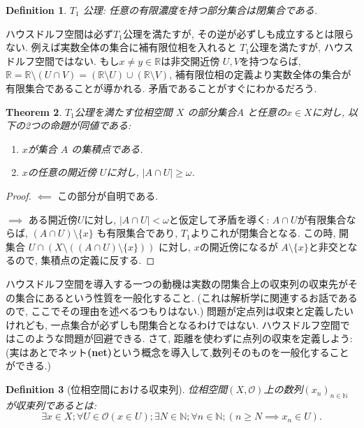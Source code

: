 \documentclass[lualatex]{ltjsbook}
\newtheorem{theorem}{Theorem}[section]
\newtheorem{definition}[theorem]{Definition}
\theoremstyle{remark}
\theoremstyle{plain}
\begin{document}
\begin{definition}
	$T_1$ 公理: 任意の有限濃度を持つ部分集合は閉集合である.
\end{definition}

ハウスドルフ空間は必ず$T_1$公理を満たすが, その逆が必ずしも成立するとは限らない.
例えば実数全体の集合に補有限位相を入れると $T_1$公理を満たすが, ハウスドルフ空間ではない. 
もし$x \neq y \in \mathbb{R}$は非交開近傍 $U,V$を持つならば,
$\mathbb{R} = \mathbb{R} \setminus \left( U \cap V \right) =\left( \mathbb{R} \setminus U \right) \cup \left( \mathbb{R} \setminus V \right) $, 補有限位相の定義より実数全体の集合が有限集合であることが導かれる.
矛盾であることがすぐにわかるだろう.

\begin{theorem}
	\label{thm: limit point}
	$T_1$公理を満たす位相空間 $X$ の部分集合$A$ と任意の$x \in X$に対し, 以下の2つの命題が同値である: 
	\begin{enumerate}
		\item $x$が集合 $A$ の集積点である.
		\item $x$の任意の開近傍 $U$に対し,  $|A\cap U| \ge \omega$.
	\end{enumerate}
\end{theorem}

\begin{proof}
	$\impliedby$ この部分が自明である.

	$\implies$ ある開近傍$U$に対し,  $ |  A \cap U | < \omega $と仮定して矛盾を導く: 
	$A\cap U$が有限集合ならば,  $\left( A \cap U \right) \setminus \{x\} $ も有限集合であり, $T_1$よりこれが閉集合となる. 
	この時, 開集合 $U\cap \left( X \setminus \left( \left( A \cap U \right)  \setminus \{ x\} \right) \right) $ に対し, $x $の開近傍になるが $A \setminus \{x\} $と非交となるので, 集積点の定義に反する.
\end{proof}

ハウスドルフ空間を導入する一つの動機は実数の閉集合上の収束列の収束先がその集合にあるという性質を一般化すること. 
(これは解析学に関連するお話であるので, ここでその理由を述べるつもりはない.)
問題が定点列は収束と定義したいけれども, 一点集合が必ずしも閉集合となるわけではない.
ハウスドルフ空間ではこのような問題が回避できる.
さて, 距離を使わずに点列の収束を定義しよう:(実はあとでネット\textbf{(net)}という概念を導入して,数列そのものを一般化することができる.)

 \begin{definition}[位相空間における収束列]
	位相空間$\left( X ,\mathcal{O} \right) $上の数列$\left( x_n \right) _{n \in \mathbb{N}}$が収束列であるとは:
	\[
	\exists x \in X ; \forall U \in \mathcal{O}\left( x \in U \right) ; \exists N \in \mathbb{N}; \forall n \in \mathbb{N}; \left( n \ge N \implies x_n \in U \right) 
	.\] 
\end{definition}
\end{document}
